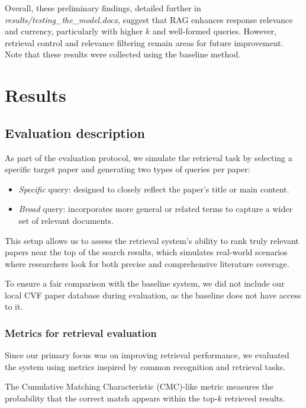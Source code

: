 \documentclass[fleqn,moreauthors,10pt]{ds_report}
\begin{document}
Overall, these preliminary findings, detailed further in \textit{results/testing\_the\_model.docx},
 suggest that RAG enhances response relevance and currency, particularly with higher $k$
  and well-formed queries. However, retrieval control and relevance filtering remain
  areas for future improvement. Note that these results were collected using the baseline method. 
  
\section*{Results}

\subsection*{Evaluation description}

As part of the evaluation protocol, we simulate the retrieval task by selecting a specific target paper
and generating two types of queries per paper:

\begin{itemize}
    \item \textit{Specific} query: designed to closely reflect the paper’s title or main content.
    \item \textit{Broad} query: incorporates more general or related terms to capture a wider set of relevant documents.
\end{itemize}

This setup allows us to assess the retrieval system’s ability to rank truly relevant papers near the top of the search results,
which simulates real-world scenarios where researchers look for both precise and comprehensive literature coverage.

To ensure a fair comparison with the baseline system, we did not include our local CVF paper database during evaluation,
as the baseline does not have access to it.

\subsubsection*{Metrics for retrieval evaluation}

Since our primary focus was on improving retrieval performance, 
we evaluated the system using metrics inspired by common recognition and retrieval tasks.

The Cumulative Matching Characteristic (CMC)-like metric measures the probability 
that the correct match appears within the top-$k$ retrieved results. 
\end{document}
